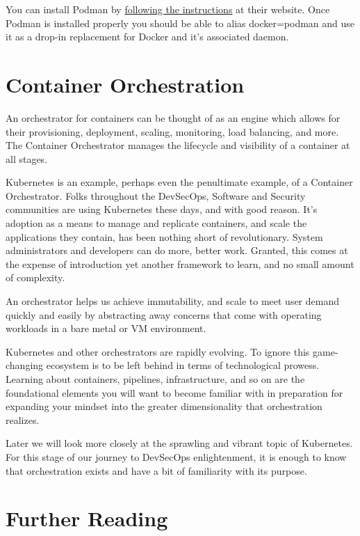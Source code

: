 \justify{}
You can install Podman by 
\href{https://podman.io/getting-started/installation.html}{following the instructions}
at their website. Once Podman is installed properly you should be able to alias docker=podman and use it as a
drop-in replacement for Docker and it's associated daemon.

\section{Container Orchestration}

\justify{}
An orchestrator for containers can be thought of as an engine which allows for their provisioning, deployment, scaling, monitoring, load
balancing, and more. The Container Orchestrator manages the lifecycle and visibility of a container at all stages.

\justify{}
Kubernetes is an example, perhaps even the penultimate example, of a Container Orchestrator.
Folks throughout the DevSecOps, Software and Security communities are using Kubernetes these days, and
with good reason. It's adoption as a means to manage and replicate containers, and scale the applications they contain,
has been nothing short of revolutionary. System administrators and developers can do more, better work. Granted, this comes at
the expense of introduction yet another framework to learn, and no small amount of complexity.

\justify{}
An orchestrator helps us achieve immutability, and scale to meet user demand quickly and easily by abstracting away
concerns that come with operating workloads in a bare metal or VM environment.

\justify{}
Kubernetes and other orchestrators are rapidly evolving. To ignore this game-changing ecosystem is to be left behind in terms of technological prowess. Learning about containers, pipelines, infrastructure, and
so on are the foundational elements you will want to become familiar with in preparation for expanding your mindset into the greater
dimensionality that orchestration realizes.

\justify{}
Later we will look more closely at the sprawling and vibrant topic of Kubernetes. For this stage of our journey to DevSecOps
enlightenment, it is enough to know that orchestration exists and have a bit of familiarity with its purpose.

\section{Further Reading}
